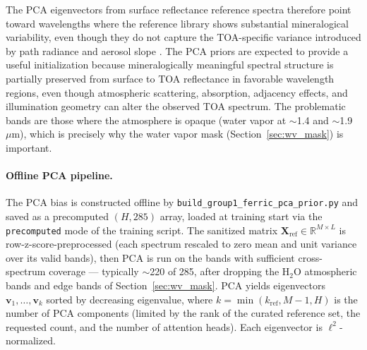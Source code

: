 \documentclass[11pt]{report}
\newcommand{\R}{\mathbb{R}}
\begin{document}
The PCA eigenvectors from surface reflectance reference spectra therefore point toward wavelengths where the reference library shows substantial mineralogical variability, even though they do not capture the TOA-specific variance introduced by path radiance and aerosol slope \cite{richter_atcor_atbd}. The PCA priors are expected to provide a useful initialization because mineralogically meaningful spectral structure is partially preserved from surface to TOA reflectance in favorable wavelength regions, even though atmospheric scattering, absorption, adjacency effects, and illumination geometry can alter the observed TOA spectrum. The problematic bands are those where the atmosphere is opaque (water vapor at $\sim$1.4 and $\sim$1.9~$\mu$m), which is precisely why the water vapor mask (Section~\ref{sec:wv_mask}) is important.
\paragraph{Offline PCA pipeline.}
The PCA bias is constructed offline by \texttt{build\_group1\_ferric\_pca\_prior.py} and saved as a precomputed $(H, 285)$ array, loaded at training start via the \texttt{precomputed} mode of the training script. The sanitized matrix $\mathbf{X}_{\text{ref}} \in \R^{M \times L}$ is row-z-score-preprocessed (each spectrum rescaled to zero mean and unit variance over its valid bands), then PCA is run on the bands with sufficient cross-spectrum coverage --- typically $\sim$220 of 285, after dropping the H$_2$O atmospheric bands and edge bands of Section~\ref{sec:wv_mask}. PCA yields eigenvectors $\mathbf{v}_1, \ldots, \mathbf{v}_k$ sorted by decreasing eigenvalue, where $k = \min(k_{\text{ref}}, M-1, H)$ is the number of PCA components (limited by the rank of the curated reference set, the requested count, and the number of attention heads). Each eigenvector is $\ell^2$-normalized.
\end{document}
